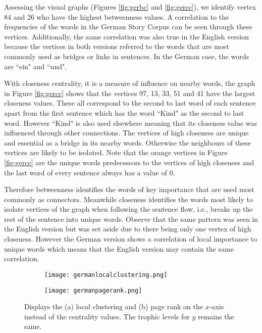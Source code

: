 Assessing the visual graphs (Figures \ref{fig:gerbc} and \ref{fig:gercc}), we identify vertex 84 and 26 who have the highest betweenness  values. A correlation to the frequencies of the words in the German Story Corpus can be seen through these vertices. Additionally, the same correlation was also true in the English version because the vertices in both versions referred to the words that are most commonly used as bridges or links in sentences. In the German case, the words are ``ein" and ``und".

With closeness centrality, it is a measure of influence on nearby words, the graph in Figure \ref{fig:gercc} shows that the vertices 97, 13, 33, 51 and 41 have the largest closeness values. These all correspond to the second to last word of each sentence apart from the first sentence which has the word ``Kind" as the second to last word. However ``Kind" is also used elsewhere meaning that its closeness value was influenced through other connections. The vertices of high closeness are unique and essential as a bridge in its nearby words. Otherwise the neighbours of these vertices are likely to be isolated. Note that the orange vertices in Figure \ref{fig:gercc} are the unique words predecessors to the vertices of high closeness and the last word of every sentence always has a value of $0$.

Therefore betweenness identifies the words of key importance that are used most commonly as connectors. Meanwhile closeness identifies the words most likely to isolate vertices of the graph when following the sentence flow, i.e., breaks up the rest of the sentence into unique words. Observe that the same pattern was seen in the English version but was set aside due to there being only one vertex of high closeness. However the German version shows a correlation of local importance to unique words which means that the English version may contain the same correlation.

\begin{figure}[!htb]
\centering
\begin{subfigure}{.45\textwidth}
	\hspace{-1cm} 
	\texttt{[image: germanlocalclustering.png]}
	\caption{}
	\label{fig:gerlc}
\end{subfigure}
\hfill
\begin{subfigure}{.45\textwidth}
	\hspace{-1cm} 
	\texttt{[image: germanpagerank.png]}
	\caption{}
	\label{fig:gerpr}
\end{subfigure}
\caption{Displays the (a) local clustering and (b) page rank on the $x$-axis instead of the centrality values. The trophic levels for $y$ remains the same.}
\label{fig:gerother}
\end{figure}

